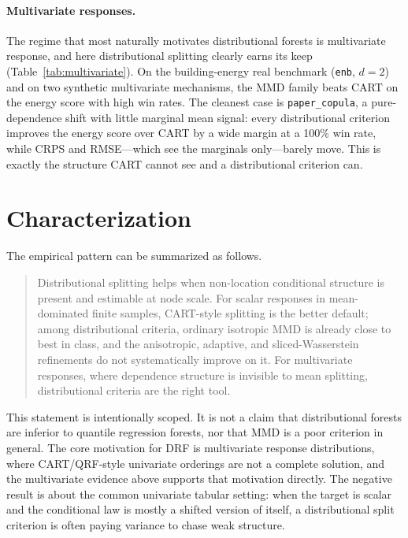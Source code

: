 \documentclass[11pt]{article}
\theoremstyle{remark}
\begin{document}


\paragraph{Multivariate responses.}
The regime that most naturally motivates distributional forests is multivariate
response, and here distributional splitting clearly earns its keep
(Table~\ref{tab:multivariate}).  On the building-energy real benchmark
(\texttt{enb}, $d=2$) and on two synthetic multivariate mechanisms, the MMD
family beats CART on the energy score with high win rates.  The cleanest case is
\texttt{paper\_copula}, a pure-dependence shift with little marginal mean signal:
every distributional criterion improves the energy score over CART by a wide
margin at a 100\% win rate, while CRPS and RMSE---which see the marginals
only---barely move.  This is exactly the structure CART cannot see and a
distributional criterion can.



\section{Characterization}

The empirical pattern can be summarized as follows.

\begin{quote}
Distributional splitting helps when non-location conditional structure is present
and estimable at node scale.  For scalar responses in mean-dominated finite
samples, CART-style splitting is the better default; among distributional
criteria, ordinary isotropic MMD is already close to best in class, and the
anisotropic, adaptive, and sliced-Wasserstein refinements do not systematically
improve on it.  For multivariate responses, where dependence structure is
invisible to mean splitting, distributional criteria are the right tool.
\end{quote}

This statement is intentionally scoped.  It is not a claim that distributional
forests are inferior to quantile regression forests, nor that MMD is a poor
criterion in general.  The core motivation for DRF is multivariate response
distributions, where CART/QRF-style univariate orderings are not a complete
solution, and the multivariate evidence above supports that motivation directly.
The negative result is about the common univariate tabular setting: when the
target is scalar and the conditional law is mostly a shifted version of itself, a
distributional split criterion is often paying variance to chase weak structure.
\end{document}
